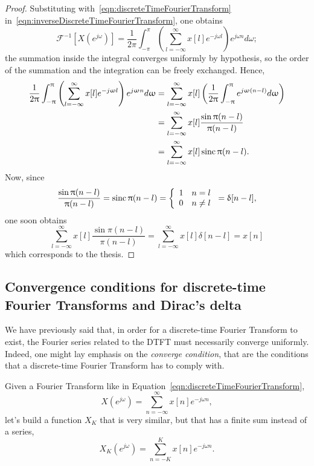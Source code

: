 \documentclass[\documentfontsize, twocolumn]{\classname}
\begin{document}
\begin{proof}
    Substituting with~\ref{eqn:discreteTimeFourierTransform} in~\ref{eqn:inverseDiscreteTimeFourierTransform}, one obtains
    \[
        \mathcal F^{-1}\left[X(e^{j\omega})\right] = \frac 1 {2\pi} \int_{-\pi}^\pi \left(\sum_{l=-\infty}^\infty x[l]e^{-j\omega l}\right)e^{j\omega n} d\omega;
    \]
    the summation inside the integral converges u\-ni\-for\-mly by hypothesis, so the order of the summation and the integration can be freely exchanged. Hence,
    \begin{align*}
        \frac 1 {2\uppi} \int_{-\uppi}^\uppi \left(\sum_{l=-\infty}^\infty x[l]e^{-j\upomega l}\right)e^{j\upomega n} d\upomega &= \sum_{l=-\infty}^\infty x[l]\left(\frac 1 {2\uppi} \int_{-\uppi}^\uppi e^{j\upomega(n-l)} d\upomega\right)\\
                                                                                                                    &= \sum_{l=-\infty}^\infty x[l]\frac {\sin{\uppi(n-l)}}{\uppi(n-l)}\\
                                                                                                                    &= \sum_{l=-\infty}^\infty x[l]\operatorname{sinc}{\uppi(n-l)}.
    \end{align*}
    Now, since
    \[ \frac {\sin{\uppi(n-l)}}{\uppi(n-l)} = \operatorname{sinc} {\uppi(n-l)} = \left\{\begin{array}{ll} 1 & n = l \\ 0 & n \neq l\end{array}\right. = \updelta[n-l],\]
    one soon obtains
    \[
        \sum_{l=-\infty}^\infty x[l] \frac {\sin{\pi(n-l)}}{\pi(n-l)} = \sum_{l=-\infty}^\infty x[l]\delta[n-l] = x[n]
    \]
    which corresponds to the thesis.
\end{proof}

\subsection{Convergence conditions for discrete-time Fou\-rier Transforms and Dirac's delta}

We have previously said that, in order for a discrete-time Fourier Transform to exist, the Fourier series related to the DTFT must necessarily converge uniformly. Indeed, one might lay emphasis on the \emph{converge condition}, that are the conditions that a discrete-time Fourier Transform has to comply with.

Given a Fourier Transform like in Equation~\ref{eqn:discreteTimeFourierTransform},
\[
    X(e^{j\omega}) = \sum_{n=-\infty}^\infty x[n] e^{-j\omega n},
\]
let's build a function $X_K$ that is very similar, but that has a finite sum instead of a series,
\[
    X_K(e^{j\omega}) = \sum_{n=-K}^K x[n] e^{-j\omega n}.
\]
\end{document}
